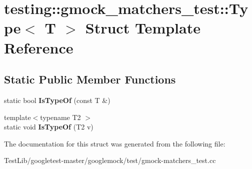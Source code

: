 \hypertarget{structtesting_1_1gmock__matchers__test_1_1Type}{}\section{testing\+:\+:gmock\+\_\+matchers\+\_\+test\+:\+:Type$<$ T $>$ Struct Template Reference}
\label{structtesting_1_1gmock__matchers__test_1_1Type}
\subsection*{Static Public Member Functions}
\begin{DoxyCompactItemize}
\item 
\mbox{\label{structtesting_1_1gmock__matchers__test_1_1Type_ad0b8d166a185471db49aa9009520d74f}} 
static bool {\bfseries Is\+Type\+Of} (const T \&)
\item 
\mbox{\label{structtesting_1_1gmock__matchers__test_1_1Type_a5451b10be4ff47bd2dc3741eb70dde59}} 
{\footnotesize template$<$typename T2 $>$ }\\static void {\bfseries Is\+Type\+Of} (T2 v)
\end{DoxyCompactItemize}


The documentation for this struct was generated from the following file\+:\begin{DoxyCompactItemize}
\item 
Test\+Lib/googletest-\/master/googlemock/test/gmock-\/matchers\+\_\+test.\+cc\end{DoxyCompactItemize}
